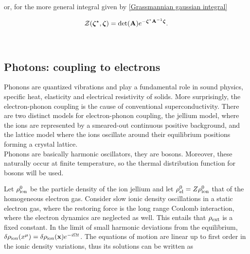 \documentclass{homework}
\begin{document}
or, for the more general integral given by \cref{Grassmannian gaussian integral}

\begin{equation}
    \mathcal{Z}(\bm{\zeta}^\star,\bm{\zeta}) = \det(\bf A) e^{-\bm{\zeta}^\star {\bf A}^{-1} \bm{\zeta}}. 
\end{equation}

\blanky \\

\subsection{Photons: coupling to electrons}

Phonons are quantized vibrations and play a fundamental role in sound physics, specific heat, elasticity and electrical resistivity of solids. More surprisingly, the electron-phonon coupling is the cause of conventional superconductivity. There are two distinct models for electron-phonon coupling, the jellium model, where the ions are represented by a smeared-out continuous positive background, and the lattice model where the ions oscillate around their equilibrium positions forming a crystal lattice. \\

Phonons are basically harmonic oscillators, they are bosons. Moreover, these naturally occur at finite temperature, so the thermal distribution function for bosons will be used. \\

\iffalse

Let $\rho^0_{\textnormal{ion}}$ be the particle density of the ion jellium and let $\rho^0_{\textnormal{el}} = Z \rho^0_{\textnormal{ion}}$ that of the homogeneous electron gas. Consider slow ionic density oscillations in a static electron gas, where the restoring force is the long range Coulomb interaction, where the electron dynamics are neglected as well. This entails that $\rho_{\textnormal{ext}}$ is a fixed constant. In the limit of small harmonic deviations from the equilibrium, $\delta \rho_{\textnormal{ion}}(x^\mu) = \delta \rho_{\textnormal{ion}} ({\bf x}) e^{-i\Omega t}$. The equations of motion are linear up to first order in the ionic density variations, thus its solutions can be written as 
\end{document}
